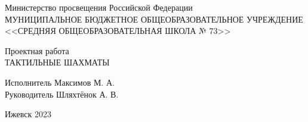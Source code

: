 \begin{titlepage}

    \begin{center}
        {\small
            Министерство просвещения Российской Федерации \\
            МУНИЦИПАЛЬНОЕ БЮДЖЕТНОЕ ОБЩЕОБРАЗОВАТЕЛЬНОЕ УЧРЕЖДЕНИЕ \\
            <<СРЕДНЯЯ ОБЩЕОБРАЗОВАТЕЛЬНАЯ ШКОЛА № 73>>
        }
    \end{center}

        \vspace{15.0em}

    \begin{center}

        {\LARGE
            Проектная работа\\
            ТАКТИЛЬНЫЕ ШАХМАТЫ \\
        }

        \vspace{13em}
        Исполнитель \hfill Максимов М. А. \\
        Руководитель \hfill Шляхтёнок А. В. \\

        \vfill

        {\small
            Ижевск 2023
        }

    \end{center}
\end{titlepage}

